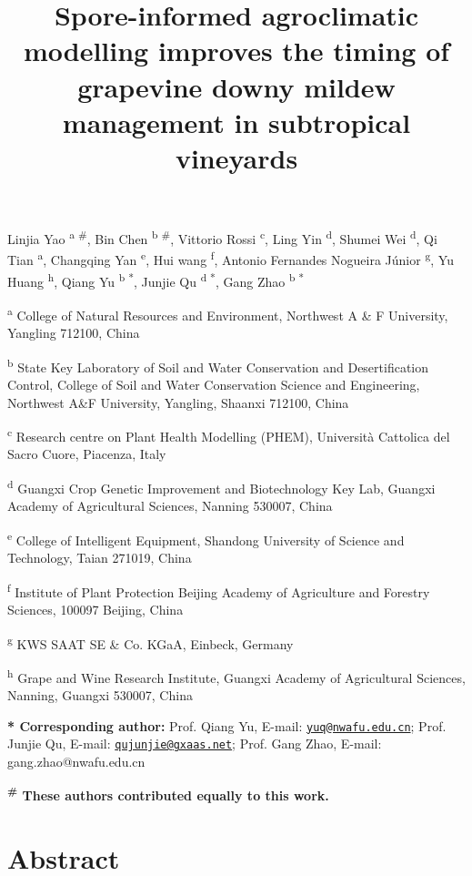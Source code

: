 \documentclass[
]{article}
\title{Spore-informed agroclimatic modelling improves the timing of
grapevine downy mildew management in subtropical vineyards}
\author{}
\date{}
\begin{document}
\doublespacing
{}
\linenumbers
\maketitle

Linjia Yao \textsuperscript{a \#}, Bin Chen \textsuperscript{b \#},
Vittorio Rossi \textsuperscript{c}, Ling Yin \textsuperscript{d}, Shumei
Wei \textsuperscript{d}, Qi Tian \textsuperscript{a}, Changqing Yan
\textsuperscript{e}, Hui wang \textsuperscript{f}, Antonio Fernandes
Nogueira Júnior \textsuperscript{g}, Yu Huang \textsuperscript{h}, Qiang
Yu \textsuperscript{b *}, Junjie Qu \textsuperscript{d *}, Gang Zhao
\textsuperscript{b *}

\textsuperscript{a} College of Natural Resources and Environment,
Northwest A \& F University, Yangling 712100, China

\textsuperscript{b} State Key Laboratory of Soil and Water Conservation
and Desertification Control, College of Soil and Water Conservation
Science and Engineering, Northwest A\&F University, Yangling, Shaanxi
712100, China

\textsuperscript{c} Research centre on Plant Health Modelling (PHEM),
Università Cattolica del Sacro Cuore, Piacenza, Italy

\textsuperscript{d} Guangxi Crop Genetic Improvement and Biotechnology
Key Lab, Guangxi Academy of Agricultural Sciences, Nanning 530007, China

\textsuperscript{e} College of Intelligent Equipment, Shandong
University of Science and Technology, Taian 271019, China

\textsuperscript{f} Institute of Plant Protection Beijing Academy of
Agriculture and Forestry Sciences, 100097 Beijing, China

\textsuperscript{g} KWS SAAT SE \& Co. KGaA, Einbeck, Germany

\textsuperscript{h} Grape and Wine Research Institute, Guangxi Academy
of Agricultural Sciences, Nanning, Guangxi 530007, China

\textbf{* Corresponding author:} Prof. Qiang Yu, E-mail:
\href{mailto:yuq@nwafu.edu.cn}{\nolinkurl{yuq@nwafu.edu.cn}}; Prof.
Junjie Qu, E-mail:
\href{mailto:qujunjie@gxaas.net}{\nolinkurl{qujunjie@gxaas.net}}; Prof.
Gang Zhao, E-mail: gang.zhao@nwafu.edu.cn

\textbf{\textsuperscript{\#} These authors contributed equally to this
work.}

\section{Abstract}\label{abstract}
\end{document}

